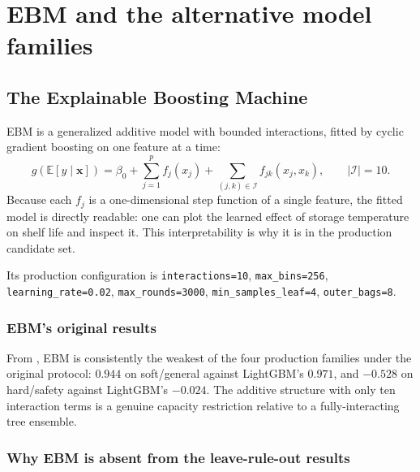 \chapter{EBM and the alternative model families}
\label{ch:ebm}

\section{The Explainable Boosting Machine}

EBM is a generalized additive model with bounded interactions, fitted by
cyclic gradient boosting on one feature at a time:
\begin{equation}
g\!\left(\mathbb{E}[y \mid \mathbf{x}]\right)
= \beta_0
+ \sum_{j=1}^{p} f_j(x_j)
+ \sum_{(j,k) \in \mathcal{I}} f_{jk}(x_j, x_k),
\qquad |\mathcal{I}| = 10 .
\end{equation}
Because each $f_j$ is a one-dimensional step function of a single feature,
the fitted model is directly readable: one can plot the learned effect of
storage temperature on shelf life and inspect it. This interpretability is
why it is in the production candidate set.

Its production configuration is \texttt{interactions=10},
\texttt{max\_bins=256}, \texttt{learning\_rate=0.02},
\texttt{max\_rounds=3000}, \texttt{min\_samples\_leaf=4},
\texttt{outer\_bags=8}.

\subsection{EBM's original results}

From , EBM is consistently the weakest of the
four production families under the original protocol: $0.944$ on
soft/general against LightGBM's $0.971$, and $-0.528$ on hard/safety
against LightGBM's $-0.024$. The additive structure with only ten
interaction terms is a genuine capacity restriction relative to a
fully-interacting tree ensemble.

\subsection{Why EBM is absent from the leave-rule-out results}

